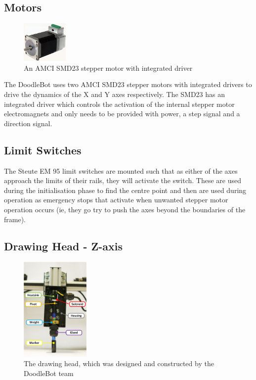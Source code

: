 \subsection{Motors}
	\begin{figure}[h]
		\centering
		\includegraphics[width=0.2\textwidth]{figures/cncMachine/amci-smd23.jpg}
		\caption{An AMCI SMD23 stepper motor with integrated driver}
	\end{figure}
	
	The DoodleBot uses two AMCI SMD23 stepper motors with integrated drivers to drive the dynamics of the X and Y axes respectively. The SMD23 has an integrated driver which controls the activation of the internal stepper motor electromagnets and only needs to be provided with power, a step signal and a direction signal.
\subsection{Limit Switches}
	The Steute EM 95 limit switches are mounted such that as either of the axes approach the limits of their rails, they will activate the switch. These are used during the initialisation phase to find the centre point and then are used during operation as emergency stops that activate when unwanted stepper motor operation occurs (ie, they go try to push the axes beyond the boundaries of the frame).
\subsection{Drawing Head - Z-axis}
	\begin{figure}[h]
		\centering
		\includegraphics[width=0.3\textwidth]{figures/cncMachine/Z_axis.jpg}
		\caption[The drawing head - Z-axis]{The drawing head, which was designed and constructed by the DoodleBot team}
	\end{figure}


